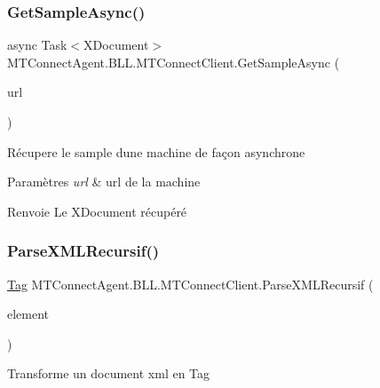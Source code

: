 \subsubsection{\texorpdfstring{Get\+Sample\+Async()}{GetSampleAsync()}}
{\footnotesize\ttfamily async Task$<$X\+Document$>$ M\+T\+Connect\+Agent.\+B\+L\+L.\+M\+T\+Connect\+Client.\+Get\+Sample\+Async (\begin{DoxyParamCaption}\item[{string}]{url }\end{DoxyParamCaption})\hspace{0.3cm}{\ttfamily [inline]}}



Récupere le sample d\textquotesingle{}une machine de façon asynchrone 


\begin{DoxyParams}{Paramètres}
{\em url} & url de la machine\\
\hline
\end{DoxyParams}
\begin{DoxyReturn}{Renvoie}
Le X\+Document récupéré
\end{DoxyReturn}
\mbox{\label{class_m_t_connect_agent_1_1_b_l_l_1_1_m_t_connect_client_a1500af478377913d4a5ad6e56e532af8}} 
\subsubsection{\texorpdfstring{Parse\+X\+M\+L\+Recursif()}{ParseXMLRecursif()}}
{\footnotesize\ttfamily \mbox{\hyperlink{class_m_t_connect_agent_1_1_model_1_1_tag}{Tag}} M\+T\+Connect\+Agent.\+B\+L\+L.\+M\+T\+Connect\+Client.\+Parse\+X\+M\+L\+Recursif (\begin{DoxyParamCaption}\item[{X\+Element}]{element }\end{DoxyParamCaption})\hspace{0.3cm}{\ttfamily [inline]}}



Transforme un document xml en Tag 


